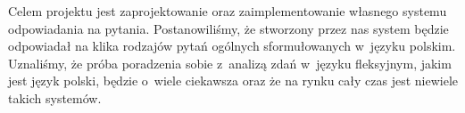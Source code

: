 Celem projektu jest zaprojektowanie oraz zaimplementowanie własnego systemu odpowiadania na pytania. Postanowiliśmy, że stworzony przez nas system będzie odpowiadał na klika rodzajów pytań ogólnych sformułowanych w~języku polskim. Uznaliśmy, że próba poradzenia sobie z~analizą zdań w~języku fleksyjnym, jakim jest język polski, będzie o~wiele ciekawsza oraz że na rynku cały czas jest niewiele takich systemów. 
